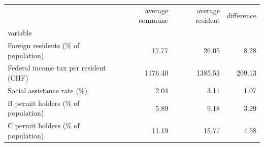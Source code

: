 \begin{tabular}{lrrr}
\toprule
 & average commune & average resident & difference \\
variable &  &  &  \\
\midrule
Foreign residents (\% of population) & 17.77 & 26.05 & 8.28 \\
Federal income tax per resident (CHF) & 1176.40 & 1385.53 & 209.13 \\
Social assistance rate (\%) & 2.04 & 3.11 & 1.07 \\
B permit holders (\% of population) & 5.89 & 9.18 & 3.29 \\
C permit holders (\% of population) & 11.19 & 15.77 & 4.58 \\
\bottomrule
\end{tabular}
